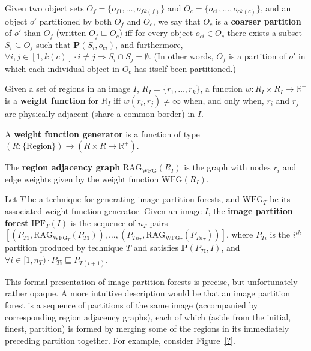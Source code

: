 \begin{definition}
Given two object sets $O_f = \{o_{f1},\ldots,o_{fk(f)}\}$ and $O_c = \{o_{c1},\ldots,o_{ck(c)}\}$, and an object $o'$ partitioned by both $O_f$ and $O_c$, we say that $O_c$ is a \textbf{coarser partition} of $o'$ than $O_f$ (written $O_f \sqsubseteq O_c$) iff for every object $o_{ci} \in O_c$ there exists a subset $S_i \subseteq O_f$ such that $\mathbf{P}(S_i, o_{ci})$, and furthermore, $\forall i,j \in [1,k(c)] \cdot i \ne j \Rightarrow S_i \cap S_j = \emptyset$. (In other words, $O_f$ is a partition of $o'$ in which each individual object in $O_c$ has itself been partitioned.)
\end{definition}

\begin{definition}
Given a set of regions in an image $I$, $R_I = \{r_1,\ldots,r_k\}$, a function $w : R_I \times R_I \rightarrow \mathbb{R}^{+}$ is a \textbf{weight function} for $R_I$ iff $w(r_i,r_j) \ne \infty$ when, and only when, $r_i$ and $r_j$ are physically adjacent (share a common border) in $I$.
\end{definition}

\begin{definition}
A \textbf{weight function generator} is a function of type $(R : \{\mbox{Region}\}) \rightarrow (R \times R \rightarrow \mathbb{R}^{+})$.
\end{definition}

\begin{definition}
The \textbf{region adjacency graph} $\mbox{RAG}_{\mbox{WFG}}(R_I)$ is the graph with nodes $r_i$ and edge weights given by the weight function $\mbox{WFG}(R_I)$.
\end{definition}

\begin{definition}
Let $T$ be a technique for generating image partition forests, and $\mbox{WFG}_T$ be its associated weight function generator. Given an image $I$, the \textbf{image partition forest} $\mbox{IPF}_{T}(I)$ is the sequence of $n_T$ pairs $[(P_{T1},\mbox{RAG}_{\mbox{WFG}_T}(P_{T1})),\ldots,(P_{Tn_T},\mbox{RAG}_{\mbox{WFG}_T}(P_{Tn_T}))]$, where $P_{Ti}$ is the $i^{th}$ partition produced by technique $T$ and satisfies $\mathbf{P}(P_{Ti},I)$, and $\forall i \in [1,n_T) \cdot P_{Ti} \sqsubseteq P_{T(i+1)}$.
\end{definition}

This formal presentation of image partition forests is precise, but unfortunately rather opaque. A more intuitive description would be that an image partition forest is a sequence of partitions of the same image (accompanied by corresponding region adjacency graphs), each of which (aside from the initial, finest, partition) is formed by merging some of the regions in its immediately preceding partition together. For example, consider Figure~\ref{?}.